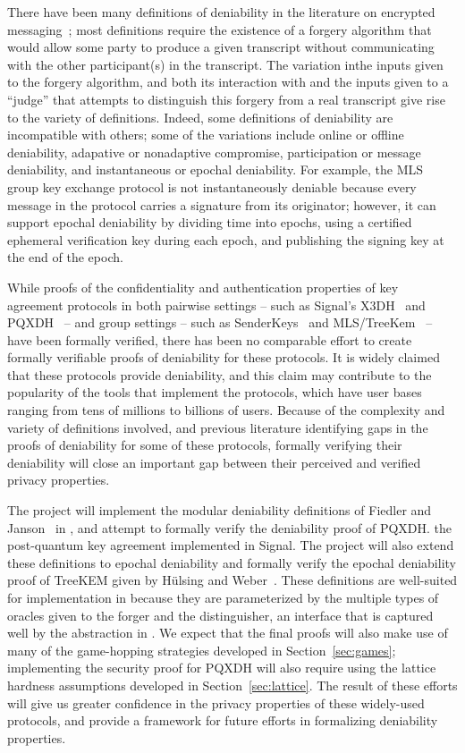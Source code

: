 There have been many definitions of deniability in the literature on encrypted messaging~\cite{...}; most definitions require the existence of a forgery algorithm that would allow some party to produce a given transcript without communicating with the other participant(s) in the transcript.  
The variation inthe  inputs given to the forgery algorithm, and both its interaction with and the inputs given to a ``judge'' that attempts to distinguish this forgery from a real transcript give rise to the variety of definitions. 
Indeed, some definitions of deniability are incompatible with others; some of the variations include online or offline deniability, adapative or nonadaptive compromise, participation or message deniability, and instantaneous or epochal deniability.
For example, the MLS group key exchange protocol is not instantaneously deniable because every message in the protocol carries a signature from its originator; however, it can support epochal deniability by dividing time into epochs, using a certified ephemeral verification key during each epoch, and publishing the signing key at the end of the epoch.

While proofs of the confidentiality and authentication properties of key agreement protocols in both pairwise settings -- such as Signal's X3DH~\cite{} and PQXDH~\cite{} -- and group settings -- such as SenderKeys~\cite{} and MLS/TreeKem~\cite{} -- have been formally verified, there has been no comparable effort to create formally verifiable proofs of deniability for these protocols.
It is widely claimed that these protocols provide deniability, and this claim may contribute to the popularity of the tools that implement the protocols, which have user bases ranging from tens of millions to billions of users.
Because of the complexity and variety of definitions involved, and previous literature identifying gaps in the proofs of deniability for some of these protocols, formally verifying their deniability will close an important gap between their perceived and verified privacy properties.

The project will implement the modular deniability definitions of Fiedler and Janson~\cite{fiedler-janson-PETS24} in \vcvio, and attempt to formally verify the deniability proof of PQXDH. the post-quantum key agreement implemented in Signal.  
The project will also extend these definitions to epochal deniability and formally verify the epochal deniability proof of TreeKEM given by Hülsing and Weber~\cite{}.  
These definitions are well-suited for implementation in \vcvio because they are parameterized by the multiple types of oracles given to the forger and the distinguisher, an interface that is captured well by the  abstraction in \vcvio.  
We expect that the final proofs will also make use of many of the game-hopping strategies developed in Section~\ref{sec:games};  implementing the security proof for PQXDH will also require using the lattice hardness assumptions developed in Section~\ref{sec:lattice}.
The result of these efforts will give us greater confidence in the privacy properties of these widely-used protocols, and provide a framework for future efforts in formalizing deniability properties.

